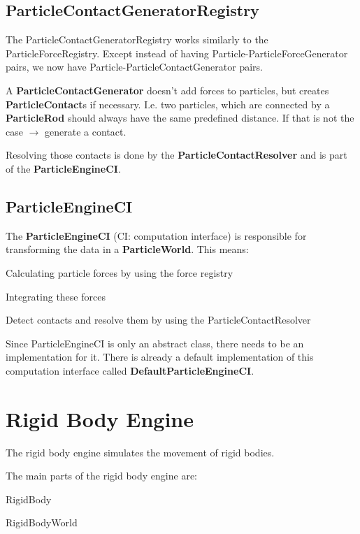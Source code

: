 \documentclass[12p, paper=a4, leqno, colorinlistoftodos]{article}
\newenvironment{packed_itemize}
{\begin{itemize}
		\setlength{\itemsep}{0pt}
		\setlength{\parskip}{0pt}
		\setlength{\parsep}{0pt}
	}{\end{itemize}}
\begin{document}
		\subsection{ParticleContactGeneratorRegistry}
		The ParticleContactGeneratorRegistry works similarly to the ParticleForceRegistry. Except instead of having Particle-ParticleForceGenerator pairs, we now have Particle-ParticleContactGenerator pairs.
		
		A \textbf{ParticleContactGenerator} doesn't add forces to particles, but creates \textbf{ParticleContact}s if necessary. I.e. two particles, which are connected by a \textbf{ParticleRod} should always have the same predefined distance. If that is not the case $\rightarrow$ generate a contact.
		
		Resolving those contacts is done by the \textbf{ParticleContactResolver} and is part of the \textbf{ParticleEngineCI}.
		
		\subsection{ParticleEngineCI}
		The \textbf{ParticleEngineCI} (CI: computation interface) is responsible for transforming the data in a \textbf{ParticleWorld}. This means:
		\begin{packed_itemize}
			\item Calculating particle forces by using the force registry
			\item Integrating these forces
			\item Detect contacts and resolve them by using the ParticleContactResolver
		\end{packed_itemize}	
		Since ParticleEngineCI is only an abstract class, there needs to be an implementation for it. There is already a default implementation of this computation interface called \textbf{DefaultParticleEngineCI}.		
	
	\pagebreak
	\section{Rigid Body Engine}
		The rigid body engine simulates the movement of rigid bodies.
		
		The main parts of the rigid body engine are:
		\begin{packed_itemize}
			\item RigidBody
			\item RigidBodyWorld
		\end{packed_itemize}
	
\end{document}
